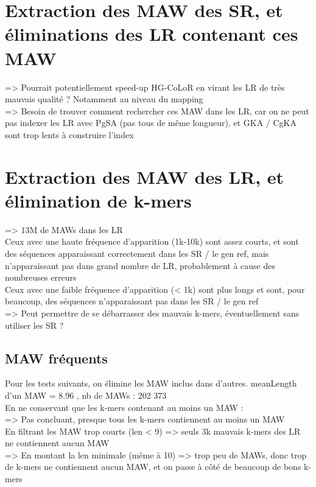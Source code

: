 \documentclass[12pt]{article}
\begin{document}
\section{Extraction des MAW des SR, et éliminations des LR contenant ces MAW}

=> Pourrait potentiellement speed-up HG-CoLoR en virant les LR de très mauvais qualité ? Notamment au niveau du mapping \\

=> Besoin de trouver comment rechercher ces MAW dans les LR, car on ne peut pas indexer les LR avec PgSA (pas tous de même longueur),
et GKA / CgKA sont trop lents à construire l'index

\section{Extraction des MAW des LR, et élimination de k-mers}

=> 13M de MAWs dans les LR \\

Ceux avec une haute fréquence d'apparition (1k-10k) sont assez courts, et sont des séquences apparaissant correctement
dans les SR / le gen ref, mais n'apparaissant pas dans grand nombre de LR, probablement à cause des nombreuses erreurs \\

Ceux avec une faible fréquence d'apparition (< 1k) sont plus longs et sont, pour beaucoup, des séquences n'apparaissant pas
dans les SR / le gen ref \\

=> Peut permettre de se débarrasser des mauvais k-mers, éventuellement sans utiliser les SR ? \\

\subsection{MAW fréquents}

Pour les tests suivants, on élimine les MAW inclus dans d'autres. meanLength d'un MAW = 8.96 , nb de MAWs : 202 373 \\

En ne conservant que les k-mers contenant au moins un MAW : \\
=> Pas concluant, presque tous les k-mers contiennent au moins un MAW \\

En filtrant les MAW trop courts (len < 9) => seuls 3k mauvais k-mers des LR ne contiennent aucun MAW \\
=> En montant la len minimale (même à 10) => trop peu de MAWs, donc trop de k-mers ne contiennent aucun MAW, et on passe à côté de beaucoup de bons k-mers \\
\end{document}
